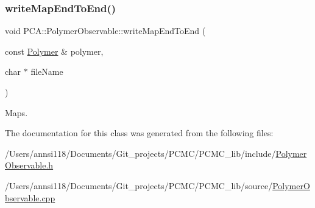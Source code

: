 \hypertarget{class_p_c_a_1_1_polymer_observable_ac63e1b37da93eca84e21916f01279a59}{}\label{class_p_c_a_1_1_polymer_observable_ac63e1b37da93eca84e21916f01279a59} 
\subsubsection{\texorpdfstring{write\+Map\+End\+To\+End()}{writeMapEndToEnd()}}
{\footnotesize\ttfamily void P\+C\+A\+::\+Polymer\+Observable\+::write\+Map\+End\+To\+End (\begin{DoxyParamCaption}\item[{const \hyperlink{class_p_c_a_1_1_polymer}{Polymer} \&}]{polymer,  }\item[{char $\ast$}]{file\+Name }\end{DoxyParamCaption})\hspace{0.3cm}{\ttfamily [static]}}



Maps. 



The documentation for this class was generated from the following files\+:\begin{DoxyCompactItemize}
\item 
/\+Users/annsi118/\+Documents/\+Git\+\_\+projects/\+P\+C\+M\+C/\+P\+C\+M\+C\+\_\+lib/include/\hyperlink{_polymer_observable_8h}{Polymer\+Observable.\+h}\item 
/\+Users/annsi118/\+Documents/\+Git\+\_\+projects/\+P\+C\+M\+C/\+P\+C\+M\+C\+\_\+lib/source/\hyperlink{_polymer_observable_8cpp}{Polymer\+Observable.\+cpp}\end{DoxyCompactItemize}
